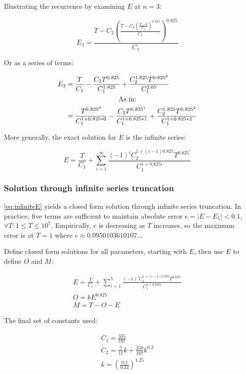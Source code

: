 \documentclass{article}
\begin{document}
Illustrating the recurrence by examining $E$ at $n=3$:

\begin{equation}
  E_3 = \frac{T - C_2\left(\frac{T - C_2\left(\frac{T - 0}{C_1}\right)^{0.825}}{C_1}\right)^{0.825}}{C_1}
\end{equation}

Or as a series of terms:

\begin{equation}
  \begin{split}
    E_3 & = \frac{T}{C_1} - \frac{C_2T^{0.825}}{C_1^{1.825}} + \frac{C_2^{1.825}T^{0.825^{2}}}{C_1^{2.65}} \\
        \span \text{As in:} \\
        & = \frac{T^{0.825^{0}}}{C_1^{1+0.825*0}} - \frac{C_2T^{0.825^{1}}}{C_1^{1+0.825*1}} + \frac{C_2^{1.825}T^{0.825^{2}}}{C_1^{1+0.825*2}} \\
  \end{split}
\end{equation}

More generally, the exact solution for $E$ is the infinite series:

\begin{equation}\label{eq:infiniteE}
  E = \frac{T}{C_1} + \sum_{i=1}^{\infty} \frac{(-1)^i C_2^{1+(i-1)0.825}T^{0.825^i}}{C_1^{1+0.825i}}
\end{equation}

\subsubsection{Solution through infinite series truncation}

\eqref{eq:infiniteE} yields a closed form solution through infinite series truncation. In practice, five terms are sufficient to maintain absolute error $e=\left| E-E_5 \right| < 0.1$, $\forall T : 1 \leq T \leq 10^7$. Empirically, $e$ is decreasing as $T$ increases, so the maximum error is at $T=1$ where $e \approx 0.0950103610107\dots$

\newpage

Define closed form solutions for all parameters, starting with $E$, then use $E$ to define $O$ and $M$:

\begin{gather}
  E = \frac{T}{C_1} + \sum_{i=1}^{5} \frac{(-1)^i C_2^{1+(i-1)0.825}T^{0.825^i}}{C_1^{1+0.825i}} \\
  O = kE^{0.825} \\
  M = T - O - E
\end{gather}

The final set of constants used:

\begin{gather}
  C_1 = \frac{335}{187} \\
  C_2 = \frac{5}{11}k + \frac{250}{187}k^{0.2} \\
  k = \left(\frac{0.2}{0.34}\right)^{1.25}
\end{gather}
\end{document}
